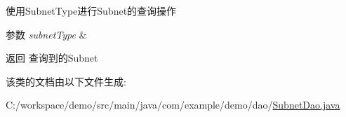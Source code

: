 使用\+Subnet\+Type进行\+Subnet的查询操作 
\begin{DoxyParams}{参数}
{\em subnet\+Type} & \\
\hline
\end{DoxyParams}
\begin{DoxyReturn}{返回}
查询到的\+Subnet 
\end{DoxyReturn}


该类的文档由以下文件生成\+:\begin{DoxyCompactItemize}
\item 
C\+:/workspace/demo/src/main/java/com/example/demo/dao/\mbox{\hyperlink{_subnet_dao_8java}{Subnet\+Dao.\+java}}\end{DoxyCompactItemize}
